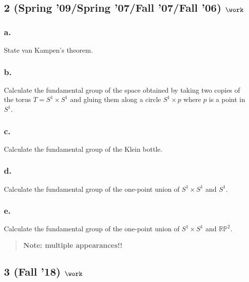 \hypertarget{spring-09spring-07fall-07fall-06-work}{%
\subsection{\texorpdfstring{2 (Spring '09/Spring '07/Fall '07/Fall '06)
\(\work\)}{2 (Spring '09/Spring '07/Fall '07/Fall '06) \textbackslash work}}\label{spring-09spring-07fall-07fall-06-work}}

\hypertarget{a.}{%
\subsubsection{a.}\label{a.}}

State van Kampen's theorem.

\hypertarget{b.}{%
\subsubsection{b.}\label{b.}}

Calculate the fundamental group of the space obtained by taking two
copies of the torus \(T = S^1 \times S^1\) and gluing them along a
circle \(S^1 \times {p}\) where \(p\) is a point in \(S^1\).

\hypertarget{c.}{%
\subsubsection{c.~}\label{c.}}

Calculate the fundamental group of the Klein bottle.

\hypertarget{d.}{%
\subsubsection{d.~}\label{d.}}

Calculate the fundamental group of the one-point union of
\(S^1 \times S^1\) and \(S^1\).

\hypertarget{e.}{%
\subsubsection{e.}\label{e.}}

Calculate the fundamental group of the one-point union of
\(S^1 \times S^1\) and \({\mathbb{RP}}^2\).

\begin{quote}
\textbf{Note: multiple appearances!!}
\end{quote}

\hypertarget{fall-18-work-1}{%
\subsection{\texorpdfstring{3 (Fall '18)
\(\work\)}{3 (Fall '18) \textbackslash work}}\label{fall-18-work-1}}

